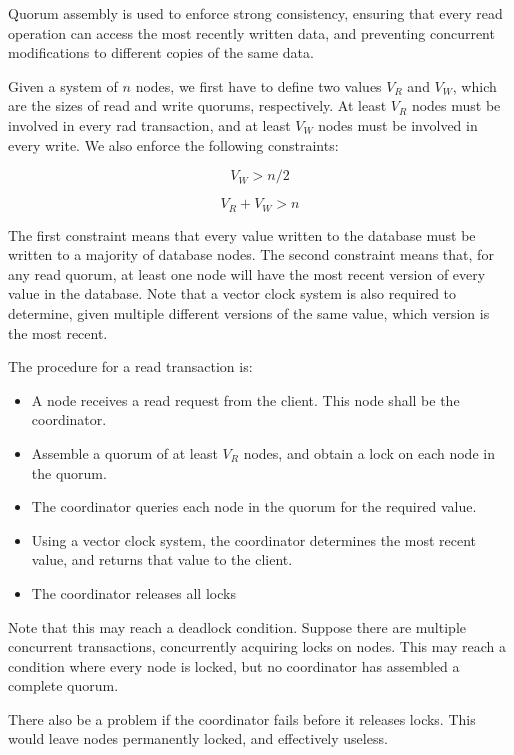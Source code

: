 \documentclass[12pt,a4paper]{article}
\begin{document}
Quorum assembly is used to enforce strong consistency, ensuring that every read operation can access the most recently written data, and preventing concurrent modifications to different copies of the same data.

Given a system of $n$ nodes, we first have to define two values $V_R$ and $V_W$, which are the sizes of read and write quorums, respectively. At least $V_R$ nodes must be involved in every rad transaction, and at least $V_W$ nodes must be involved in every write. We also enforce the following constraints:

$$V_W > n / 2$$

$$V_R + V_W > n$$

The first constraint means that every value written to the database must be written to a majority of database nodes. The second constraint means that, for any read quorum, at least one node will have the most recent version of every value in the database. Note that a vector clock system is also required to determine, given multiple different versions of the same value, which version is the most recent.

The procedure for a read transaction is:

\begin{itemize}
  \item
  A node receives a read request from the client. This node shall be the coordinator.

  \item
  Assemble a quorum of at least $V_R$ nodes, and obtain a lock on each node in the quorum.

  \item
  The coordinator queries each node in the quorum for the required value.

  \item
  Using a vector clock system, the coordinator determines the most recent value, and returns that value to the client.

  \item
  The coordinator releases all locks

\end{itemize}

Note that this may reach a deadlock condition. Suppose there are multiple concurrent transactions, concurrently acquiring locks on nodes. This may reach a condition where every node is locked, but no coordinator has assembled a complete quorum.

There also be a problem if the coordinator fails before it releases locks. This would leave nodes permanently locked, and effectively useless.
\end{document}
